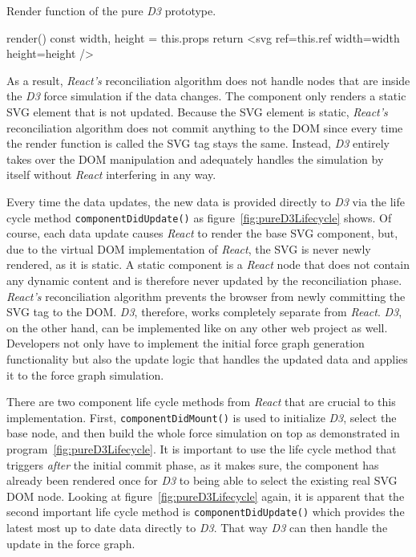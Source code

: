 \begin{program}
\caption{Render function of the pure \emph{D3} prototype.}
\label{prog:pureD3render}
\begin{JsCode}
render() {
  const { width, height } = this.props
  return <svg ref={this.ref} width={width} height={height} />
}
\end{JsCode}
\end{program}

As a result, \emph{React's} reconciliation algorithm does not handle nodes that are inside the \emph{D3} force simulation if the data changes. The component only renders a static SVG element that is not updated. Because the SVG element is static, \emph{React's} reconciliation algorithm does not commit anything to the DOM since every time the render function is called the SVG tag stays the same. Instead, \emph{D3} entirely takes over the DOM manipulation and adequately handles the simulation by itself without \emph{React} interfering in any way.

Every time the data updates, the new data is provided directly to \emph{D3} via the life cycle method \texttt{componentDidUpdate()} as figure~\ref{fig:pureD3Lifecycle} shows. Of course, each data update causes \emph{React} to render the base SVG component, but, due to the virtual DOM implementation of \emph{React}, the SVG is never newly rendered, as it is static. A static component is a \emph{React} node that does not contain any dynamic content and is therefore never updated by the reconciliation phase. \emph{React's} reconciliation algorithm prevents the browser from newly committing the SVG tag to the DOM. \emph{D3}, therefore, works completely separate from \emph{React}. \emph{D3}, on the other hand, can be implemented like on any other web project as well. Developers not only have to implement the initial force graph generation functionality but also the update logic that handles the updated data and applies it to the force graph simulation.

There are two component life cycle methods from \emph{React} that are crucial to this implementation. First, \texttt{componentDidMount()} is used to initialize \emph{D3}, select the base node, and then build the whole force simulation on top as demonstrated in program~\ref{fig:pureD3Lifecycle}. It is important to use the life cycle method that triggers \emph{after} the initial commit phase, as it makes sure, the component has already been rendered once for \emph{D3} to being able to select the existing real SVG DOM node. Looking at figure~\ref{fig:pureD3Lifecycle} again, it is apparent that the second important life cycle method is \texttt{componentDidUpdate()} which provides the latest most up to date data directly to \emph{D3}. That way \emph{D3} can then handle the update in the force graph.

